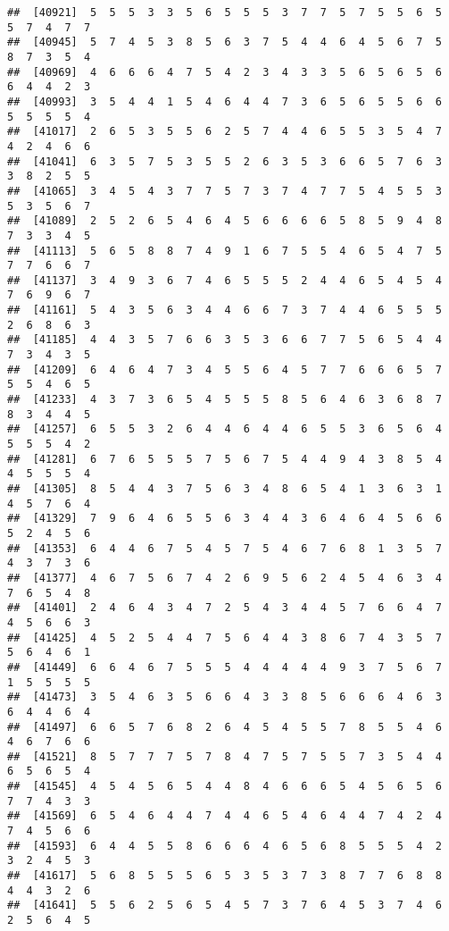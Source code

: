 \documentclass[
]{book}
\begin{document}
\begin{verbatim}
##  [40921]  5  5  5  3  3  5  6  5  5  5  3  7  7  5  7  5  5  6  5  5  7  4  7  7
##  [40945]  5  7  4  5  3  8  5  6  3  7  5  4  4  6  4  5  6  7  5  8  7  3  5  4
##  [40969]  4  6  6  6  4  7  5  4  2  3  4  3  3  5  6  5  6  5  6  6  4  4  2  3
##  [40993]  3  5  4  4  1  5  4  6  4  4  7  3  6  5  6  5  5  6  6  5  5  5  5  4
##  [41017]  2  6  5  3  5  5  6  2  5  7  4  4  6  5  5  3  5  4  7  4  2  4  6  6
##  [41041]  6  3  5  7  5  3  5  5  2  6  3  5  3  6  6  5  7  6  3  3  8  2  5  5
##  [41065]  3  4  5  4  3  7  7  5  7  3  7  4  7  7  5  4  5  5  3  5  3  5  6  7
##  [41089]  2  5  2  6  5  4  6  4  5  6  6  6  6  5  8  5  9  4  8  7  3  3  4  5
##  [41113]  5  6  5  8  8  7  4  9  1  6  7  5  5  4  6  5  4  7  5  7  7  6  6  7
##  [41137]  3  4  9  3  6  7  4  6  5  5  5  2  4  4  6  5  4  5  4  7  6  9  6  7
##  [41161]  5  4  3  5  6  3  4  4  6  6  7  3  7  4  4  6  5  5  5  2  6  8  6  3
##  [41185]  4  4  3  5  7  6  6  3  5  3  6  6  7  7  5  6  5  4  4  7  3  4  3  5
##  [41209]  6  4  6  4  7  3  4  5  5  6  4  5  7  7  6  6  6  5  7  5  5  4  6  5
##  [41233]  4  3  7  3  6  5  4  5  5  5  8  5  6  4  6  3  6  8  7  8  3  4  4  5
##  [41257]  6  5  5  3  2  6  4  4  6  4  4  6  5  5  3  6  5  6  4  5  5  5  4  2
##  [41281]  6  7  6  5  5  5  7  5  6  7  5  4  4  9  4  3  8  5  4  4  5  5  5  4
##  [41305]  8  5  4  4  3  7  5  6  3  4  8  6  5  4  1  3  6  3  1  4  5  7  6  4
##  [41329]  7  9  6  4  6  5  5  6  3  4  4  3  6  4  6  4  5  6  6  5  2  4  5  6
##  [41353]  6  4  4  6  7  5  4  5  7  5  4  6  7  6  8  1  3  5  7  4  3  7  3  6
##  [41377]  4  6  7  5  6  7  4  2  6  9  5  6  2  4  5  4  6  3  4  7  6  5  4  8
##  [41401]  2  4  6  4  3  4  7  2  5  4  3  4  4  5  7  6  6  4  7  4  5  6  6  3
##  [41425]  4  5  2  5  4  4  7  5  6  4  4  3  8  6  7  4  3  5  7  5  6  4  6  1
##  [41449]  6  6  4  6  7  5  5  5  4  4  4  4  4  9  3  7  5  6  7  1  5  5  5  5
##  [41473]  3  5  4  6  3  5  6  6  4  3  3  8  5  6  6  6  4  6  3  6  4  4  6  4
##  [41497]  6  6  5  7  6  8  2  6  4  5  4  5  5  7  8  5  5  4  6  4  6  7  6  6
##  [41521]  8  5  7  7  7  5  7  8  4  7  5  7  5  5  7  3  5  4  4  6  5  6  5  4
##  [41545]  4  5  4  5  6  5  4  4  8  4  6  6  6  5  4  5  6  5  6  7  7  4  3  3
##  [41569]  6  5  4  6  4  4  7  4  4  6  5  4  6  4  4  7  4  2  4  7  4  5  6  6
##  [41593]  6  4  4  5  5  8  6  6  6  4  6  5  6  8  5  5  5  4  2  3  2  4  5  3
##  [41617]  5  6  8  5  5  5  6  5  3  5  3  7  3  8  7  7  6  8  8  4  4  3  2  6
##  [41641]  5  5  6  2  5  6  5  4  5  7  3  7  6  4  5  3  7  4  6  2  5  6  4  5

\end{verbatim}
\end{document}
